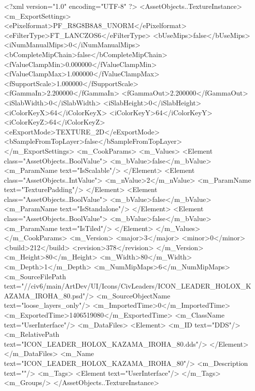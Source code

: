 <?xml version="1.0" encoding="UTF-8" ?>
<AssetObjects..TextureInstance>
	<m_ExportSettings>
		<ePixelformat>PF_R8G8B8A8_UNORM</ePixelformat>
		<eFilterType>FT_LANCZOS6</eFilterType>
		<bUseMips>false</bUseMips>
		<iNumManualMips>0</iNumManualMips>
		<bCompleteMipChain>false</bCompleteMipChain>
		<fValueClampMin>0.000000</fValueClampMin>
		<fValueClampMax>1.000000</fValueClampMax>
		<fSupportScale>1.000000</fSupportScale>
		<fGammaIn>2.200000</fGammaIn>
		<fGammaOut>2.200000</fGammaOut>
		<iSlabWidth>0</iSlabWidth>
		<iSlabHeight>0</iSlabHeight>
		<iColorKeyX>64</iColorKeyX>
		<iColorKeyY>64</iColorKeyY>
		<iColorKeyZ>64</iColorKeyZ>
		<eExportMode>TEXTURE_2D</eExportMode>
		<bSampleFromTopLayer>false</bSampleFromTopLayer>
	</m_ExportSettings>
	<m_CookParams>
		<m_Values>
			<Element class="AssetObjects..BoolValue">
				<m_bValue>false</m_bValue>
				<m_ParamName text="IsScalable"/>
			</Element>
			<Element class="AssetObjects..IntValue">
				<m_nValue>2</m_nValue>
				<m_ParamName text="TexturePadding"/>
			</Element>
			<Element class="AssetObjects..BoolValue">
				<m_bValue>false</m_bValue>
				<m_ParamName text="IsStandalone"/>
			</Element>
			<Element class="AssetObjects..BoolValue">
				<m_bValue>false</m_bValue>
				<m_ParamName text="IsTiled"/>
			</Element>
		</m_Values>
	</m_CookParams>
	<m_Version>
		<major>3</major>
		<minor>0</minor>
		<build>212</build>
		<revision>378</revision>
	</m_Version>
	<m_Height>80</m_Height>
	<m_Width>80</m_Width>
	<m_Depth>1</m_Depth>
	<m_NumMipMaps>6</m_NumMipMaps>
	<m_SourceFilePath text="//civ6/main/ArtDev/UI/Icons/CivLeaders/ICON_LEADER_HOLOX_KAZAMA_IROHA_80.psd"/>
	<m_SourceObjectName text="loose_layers_only"/>
	<m_ImportedTime>0</m_ImportedTime>
	<m_ExportedTime>1406519080</m_ExportedTime>
	<m_ClassName text="UserInterface"/>
	<m_DataFiles>
		<Element>
			<m_ID text="DDS"/>
			<m_RelativePath text="ICON_LEADER_HOLOX_KAZAMA_IROHA_80.dds"/>
		</Element>
	</m_DataFiles>
	<m_Name text="ICON_LEADER_HOLOX_KAZAMA_IROHA_80"/>
	<m_Description text=""/>
	<m_Tags>
		<Element text="UserInterface"/>
	</m_Tags>
	<m_Groups/>
</AssetObjects..TextureInstance>

